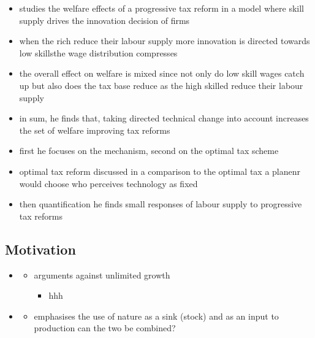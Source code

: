 \begin{itemize}
\cite{Loebbing2019NationalChange}
\begin{itemize}
	\item studies the welfare effects of a progressive tax reform in a model where skill supply drives the innovation decision of firms
	\item when the rich reduce their labour supply more \ar innovation is directed towards low skills\ar the wage distribution compresses
	\item the overall effect on welfare is mixed since not only do low skill wages catch up but also does the tax base reduce as the high skilled reduce their labour supply
	\item in sum, he finds that, taking directed technical change into account increases the set of welfare improving tax reforms 
	\item first he focuses on the mechanism, second on the optimal tax scheme
	\item optimal tax reform discussed in a comparison to the optimal tax a planenr would choose who perceives technology as fixed
	\item then quantification \ar he finds small responses of labour supply to progressive tax reforms
\end{itemize}
\end{itemize}


\subsection{Motivation}
\begin{itemize}
\item \cite{Schor2005SustainableReduction}
\begin{itemize}
	\item arguments against unlimited growth
	\begin{itemize}
\item hhh
	\end{itemize}
\end{itemize}
\item \cite{Dasgupta2021}
\begin{itemize}
\item emphasises the use of nature as a sink (stock) and as an input to production \ar can the two be combined?
\end{itemize}
\end{itemize}
